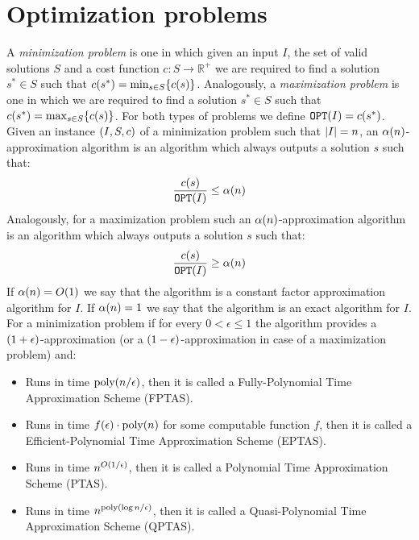\section{Optimization problems}
A \textit{minimization problem} is one in which given an input $I$, the set of valid solutions $S$ and a cost function $c:S \to \mathbb{R}^+$ we are required to find a solution $s^*\in S$ such that $c\mathopen{}\left( s^* \right)=\min_{s\in S}\mathopen{}\left\{ c\mathopen{}\left( s \right) \right\}$. Analogously, a \textit{maximization problem} is one in which we are required to find a solution $s^*\in S$ such that $c\mathopen{}\left( s^* \right)=\max_{s\in S}\mathopen{}\left\{ c\mathopen{}\left( s \right) \right\}$. For both types of problems we define $\texttt{OPT}\mathopen{}\left( I \right) = c\mathopen{}\left( s^* \right)$. Given an instance $\mathopen{}\left( I, S, c \right)$ of a minimization problem such that $\mathopen{}\left| I \right| = n$, an $\alpha\mathopen{}\left( n \right)$-approximation algorithm is an algorithm which always outputs a solution $s$ such that:
$$
\frac{c\mathopen{}\left( s \right)}{\texttt{OPT}\mathopen{}\left( I \right)} \leq \alpha\mathopen{}\left( n \right)
$$
Analogously, for a maximization problem such an $\alpha\mathopen{}\left( n \right)$-approximation algorithm is an algorithm which always outputs a solution $s$ such that:
$$
\frac{c\mathopen{}\left( s \right)}{\texttt{OPT}\mathopen{}\left( I \right)} \geq \alpha\mathopen{}\left( n \right)
$$
If $\alpha\mathopen{}\left( n \right)=O\mathopen{}\left( 1 \right)$ we say that the algorithm is a constant factor approximation algorithm for $I$. If $\alpha\mathopen{}\left( n \right)=1$ we say that the algorithm is an exact algorithm for $I$. For a minimization problem if for every $0<\epsilon\leq1$ the algorithm provides a $\mathopen{}\left( 1+\epsilon \right)$-approximation (or a $\mathopen{}\left( 1-\epsilon \right)$-approximation in case of a maximization problem) and:
\begin{itemize}
    \item Runs in time $\text{poly}\mathopen{}\left( n/\epsilon \right)$, then it is called a Fully-Polynomial Time Approximation Scheme (FPTAS).
    \item Runs in time $f\mathopen{}\left( \epsilon \right)\cdot\text{poly}\mathopen{}\left( n \right)$ for some computable function $f$, then it is called a Efficient-Polynomial Time Approximation Scheme (EPTAS).
    \item Runs in time $n^{O\mathopen{}\left( 1/\epsilon \right)}$, then it is called a Polynomial Time Approximation Scheme (PTAS).
    \item Runs in time $n^{\text{poly}\mathopen{}\left( \log n/\epsilon \right)}$, then it is called a Quasi-Polynomial Time Approximation Scheme (QPTAS).
\end{itemize}
